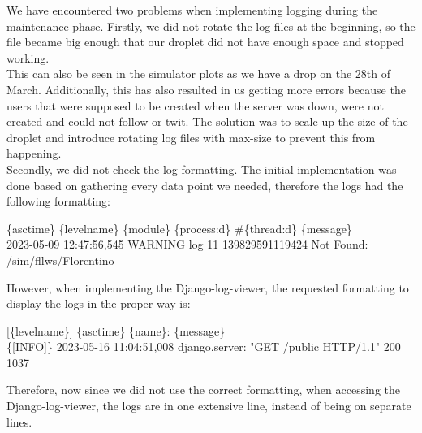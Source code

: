 We have encountered two problems when implementing logging during the maintenance phase. Firstly, we did not rotate the log files at the beginning, so the file became big enough that our droplet did not have enough space and stopped working.\\
This can also be seen in the simulator plots as we have a drop on the 28th of March. Additionally, this has also resulted in us getting more errors because the users that were supposed to be created when the server was down, were not created and could not follow or twit. The solution was to scale up the size of the droplet and introduce rotating log files with max-size to prevent this from happening.\\
Secondly, we did not check the log formatting. The initial implementation was done based on gathering every data point we needed, therefore the logs had the following formatting:
\begin{center}
    \{asctime\} \{levelname\} \{module\} \{process:d\} \#\{thread:d\} \{message\}\\
    2023-05-09 12:47:56,545 WARNING log 11 139829591119424 Not Found: /sim/fllws/Florentino
\end{center}
However, when implementing the Django-log-viewer, the requested formatting to display the logs in the proper way is:
\begin{center}
    [\{levelname\}] \{asctime\} \{name\}: \{message\}\\
    \{[INFO]\} 2023-05-16 11:04:51,008 django.server: "GET /public HTTP/1.1" 200 1037
\end{center}
Therefore, now since we did not use the correct formatting, when accessing the Django-log-viewer, the logs are in one extensive line, instead of being on separate lines.\\
